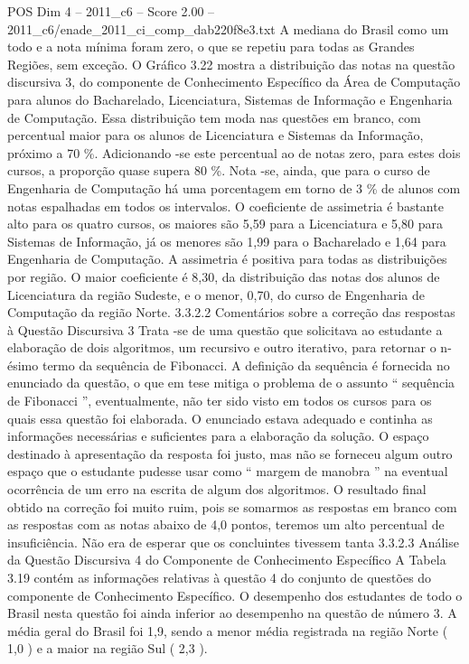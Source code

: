 \begin{textsample}{POS Dim 4 – 2011\_c6 – Score 2.00 – 2011\_c6/enade\_2011\_ci\_comp\_dab220f8e3.txt}
A mediana do Brasil como um todo e a nota mínima foram zero, o que se repetiu para todas as Grandes Regiões, sem exceção.
O Gráfico 3.22 mostra a distribuição das notas na questão discursiva 3, do componente de Conhecimento Específico da Área de Computação para alunos do Bacharelado, Licenciatura, Sistemas de Informação e Engenharia de Computação.
Essa distribuição tem moda nas questões em branco, com percentual maior para os alunos de Licenciatura e Sistemas da Informação, próximo a 70 \%.
Adicionando -se este percentual ao de notas zero, para estes dois cursos, a proporção quase supera 80 \%.
Nota -se, ainda, que para o curso de Engenharia de Computação há uma porcentagem em torno de 3 \% de alunos com notas espalhadas em todos os intervalos.
O coeficiente de assimetria é bastante alto para os quatro cursos, os maiores são 5,59 para a Licenciatura e 5,80 para Sistemas de Informação, já os menores são 1,99 para o Bacharelado e 1,64 para Engenharia de Computação.
A assimetria é positiva para todas as distribuições por região.
O maior coeficiente é 8,30, da distribuição das notas dos alunos de Licenciatura da região Sudeste, e o menor, 0,70, do curso de Engenharia de Computação da região Norte. 3.3.2.2 Comentários sobre a correção das respostas à Questão Discursiva 3 Trata -se de uma questão que solicitava ao estudante a elaboração de dois algoritmos, um recursivo e outro iterativo, para retornar o n-ésimo termo da sequência de Fibonacci.
A definição da sequência é fornecida no enunciado da questão, o que em tese mitiga o problema de o assunto “ sequência de Fibonacci ”, eventualmente, não ter sido visto em todos os cursos para os quais essa questão foi elaborada.
O enunciado estava adequado e continha as informações necessárias e suficientes para a elaboração da solução.
O espaço destinado à apresentação da resposta foi justo, mas não se forneceu algum outro espaço que o estudante pudesse usar como “ margem de manobra ” na eventual ocorrência de um erro na escrita de algum dos algoritmos.
O resultado final obtido na correção foi muito ruim, pois se somarmos as respostas em branco com as respostas com as notas abaixo de 4,0 pontos, teremos um alto percentual de insuficiência.
Não era de esperar que os concluintes tivessem tanta 3.3.2.3 Análise da Questão Discursiva 4 do Componente de Conhecimento Específico A Tabela 3.19 contém as informações relativas à questão 4 do conjunto de questões do componente de Conhecimento Específico.
O desempenho dos estudantes de todo o Brasil nesta questão foi ainda inferior ao desempenho na questão de número 3.
A média geral do Brasil foi 1,9, sendo a menor média registrada na região Norte ( 1,0 ) e a maior na região Sul ( 2,3 ).

\end{textsample}
